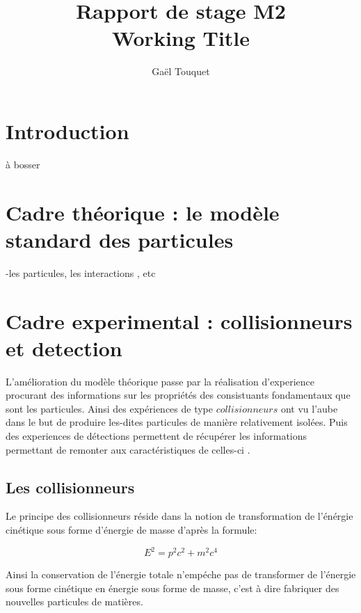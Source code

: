 \documentclass[a4paper,12pt]{report}
\title{Rapport de stage M2 \\ Working Title}
\author{Gaël Touquet}
\begin{document}
\maketitle
\newpage
\tableofcontents

\chapter*{Introduction}

à bosser

\chapter{Cadre théorique : le modèle standard des particules}

-les particules, les interactions , etc


\chapter{Cadre experimental : collisionneurs et detection}

L'amélioration du modèle théorique passe par la réalisation d'experience procurant des informations sur les propriétés des consistuants fondamentaux que sont les particules. Ainsi des expériences de type $collisionneurs$ ont vu l'aube dans le but de produire les-dites particules de manière relativement isolées. Puis des experiences de détections permettent de récupérer les informations permettant de remonter aux caractéristiques de celles-ci .

\section{Les collisionneurs}

Le principe des collisionneurs réside dans la notion de transformation de l'énérgie cinétique sous forme d'énergie de masse d'après la formule:

\begin{equation}
\label{Energie}
E^{2} = p^{2}c^{2} + m^{2}c^{4}
\end{equation}


Ainsi la conservation de l'énergie totale n'empéche pas de transformer de l'énergie sous forme cinétique en énergie sous forme de masse, c'est à dire fabriquer des nouvelles particules de matières.
\end{document}
